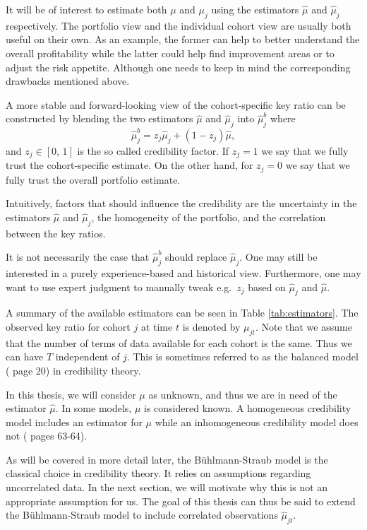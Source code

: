 \documentclass[11pt]{article}
\theoremstyle{definition}
\begin{document}
It will be of interest to estimate both $\mu$ and $\mu_j$ using the estimators $\hat\mu$ and $\hat\mu_j$ respectively. The portfolio view and the individual cohort view are usually both useful on their own. As an example, the former can help to better understand the overall profitability while the latter could help find improvement areas or to adjust the risk appetite. Although one needs to keep in mind the corresponding drawbacks mentioned above.

A more stable and forward-looking view of the cohort-specific key ratio can be constructed by blending the two estimators $\hat\mu$ and $\hat\mu_j$ into $\hat\mu_j^b$ where
\begin{equation}\label{eq:mu_j_b}
    \hat\mu_j^b = z_j\hat\mu_j + (1-z_j)\hat\mu,
\end{equation}
and $z_j\in[0,\,1]$ is the so called credibility factor. If $z_j=1$ we say that we fully trust the cohort-specific estimate. On the other hand, for $z_j=0$ we say that we fully trust the overall portfolio estimate.

Intuitively, factors that should influence the credibility are the uncertainty in the estimators $\hat\mu$ and $\hat\mu_j$, the homogeneity of the portfolio, and the correlation between the key ratios.

It is not necessarily the case that $\hat\mu_j^b$ should replace $\hat\mu_j$. One may still be interested in a purely experience-based and historical view. Furthermore, one may want to use expert judgment to manually tweak e.g.\ $z_j$ based on $\hat\mu_j$ and $\hat\mu$.

A summary of the available estimators can be seen in Table \ref{tab:estimators}. The observed key ratio for cohort $j$ at time $t$ is denoted by $\mu_{jt}$. Note that we assume that the number of terms of data available for each cohort is the same. Thus we can have $T$ independent of $j$. This is sometimes referred to as the balanced model (\cite{wen2} page 20) in credibility theory.

In this thesis, we will consider $\mu$ as unknown, and thus we are in need of the estimator $\hat\mu$. In some models, $\mu$ is considered known. A homogeneous credibility model includes an estimator for $\mu$ while an inhomogeneous credibility model does not (\cite{buhlmann} pages 63-64).

As will be covered in more detail later, the Bühlmann-Straub model is the classical choice in credibility theory. It relies on assumptions regarding uncorrelated data. In the next section, we will motivate why this is not an appropriate assumption for us. The goal of this thesis can thus be said to extend the Bühlmann-Straub model to include correlated observations $\hat\mu_{jt}$.
\end{document}
